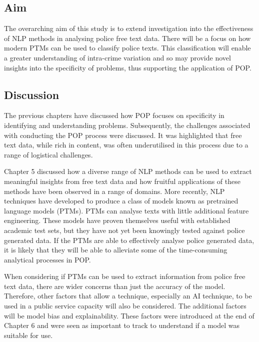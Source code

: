 \subsection{Aim} 

The overarching aim of this study is to extend investigation into the effectiveness of NLP methods in analysing police free text data. There will be a focus on how modern PTMs can be used to classify police texts. This classification will enable a greater understanding of intra-crime variation and so may provide novel insights into the specificity of problems, thus supporting the application of POP.



\subsection{Discussion} 

The previous chapters have discussed how POP focuses on specificity in identifying and understanding problems. Subsequently, the challenges associated with conducting the POP process were discussed. It was highlighted that free text data, while rich in content, was often underutilised in this process due to a range of logistical challenges.

Chapter 5 discussed how a diverse range of NLP methods can be used to extract meaningful insights from free text data and how fruitful applications of these methods have been observed in a range of domains. More recently, NLP techniques have developed to produce a class of models known as pretrained language models (PTMs). PTMs can analyse texts with little additional feature engineering. These models have proven themselves useful with established academic test sets, but they have not yet been knowingly tested against police generated data. If the PTMs are able to effectively analyse police generated data, it is likely that they will be able to alleviate some of the time-consuming analytical processes in POP.

When considering if PTMs can be used to extract information from police free text data, there are wider concerns than just the accuracy of the model. Therefore, other factors that allow a technique, especially an AI technique, to be used in a public service capacity will also be considered. The additional factors will be model bias and explainability. These factors were introduced at the end of Chapter 6 and were seen as important to track to understand if a model was suitable for use.

